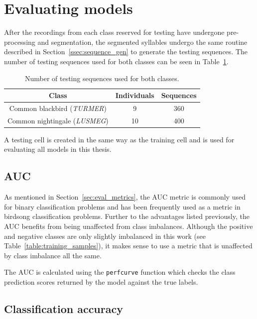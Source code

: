 \section{Evaluating models}

After the recordings from each class reserved for testing have undergone
pre-processing and segmentation, the segmented syllables undergo the same
routine described in Section~\ref{ssec:sequence_gen} to generate the testing
sequences. The number of testing sequences used for both classes can be seen in
Table~\ref{table:testing_samples}.

\begin{table}[ht]
\begin{center}
\begin{tabular}{c c c}
\toprule
Class & Individuals & Sequences \\ [0.5ex]
\midrule
Common blackbird (\textit{TURMER}) & 9 & 360 \\
Common nightingale (\textit{LUSMEG}) & 10 & 400 \\
\bottomrule
\end{tabular}
\caption{Number of testing sequences used for both
classes.}\label{table:testing_samples}
\end{center}
\end{table}

A testing cell is created in the same way as the training cell and is used for
evaluating all models in this thesis.

\subsection{AUC}

As mentioned in Section~\ref{sec:eval_metrics}, the AUC metric is commonly used
for binary classification problems and has been frequently used as a metric in
birdsong classification problems. Further to the advantages listed previously,
the AUC benefits from being unaffected from class imbalances. Although the
positive and negative classes are only slightly imbalanced in this work (see
Table~\ref{table:training_samples}), it makes sense to use a metric that is
unaffected by class imbalance all the same.

The AUC is calculated using the \texttt{perfcurve} function which checks the
class prediction scores returned by the model against the true labels.

\subsection{Classification accuracy}

